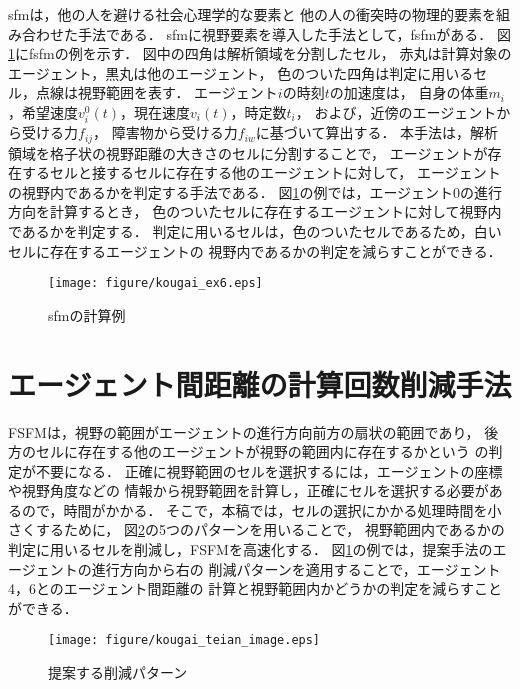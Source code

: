 \documentclass{maelab_y}
\begin{document}
sfmは，他の人を避ける社会心理学的な要素と
他の人の衝突時の物理的要素を組み合わせた手法である．
sfmに視野要素を導入した手法として，fsfmがある．
図\ref{fig:seru_ex1}にfsfmの例を示す．
図中の四角は解析領域を分割したセル，
赤丸は計算対象のエージェント，黒丸は他のエージェント，
色のついた四角は判定に用いるセル，点線は視野範囲を表す．
エージェント$i$の時刻$t$の加速度は，
自身の体重$m_i$，希望速度$v_i^0(t)$，現在速度$v_i(t)$，時定数$t_i$，
および，近傍のエージェントから受ける力$f_{ij}$，
障害物から受ける力$f_{iw}$に基づいて算出する．
本手法は，解析領域を格子状の視野距離の大きさのセルに分割することで，
エージェントが存在するセルと接するセルに存在する他のエージェントに対して，
エージェントの視野内であるかを判定する手法である．
図\ref{fig:seru_ex1}の例では，エージェント0の進行方向を計算するとき，
色のついたセルに存在するエージェントに対して視野内であるかを判定する．
判定に用いるセルは，色のついたセルであるため，白いセルに存在するエージェントの
視野内であるかの判定を減らすことができる．

\begin{figure}[hbtp]
 \begin{center}
  \texttt{[image: figure/kougai\_ex6.eps]}
  \caption{sfmの計算例}
  \label{fig:seru_ex1}
 \end{center}
\end{figure}
\fi

\section{エージェント間距離の計算回数削減手法}
FSFMは，視野の範囲がエージェントの進行方向前方の扇状の範囲であり，
後方のセルに存在する他のエージェントが視野の範囲内に存在するかという
の判定が不要になる．
正確に視野範囲のセルを選択するには，エージェントの座標や視野角度などの
情報から視野範囲を計算し，正確にセルを選択する必要があるので，時間がかかる．
そこで，本稿では，セルの選択にかかる処理時間を小さくするために，
図\ref{fig:teian_image}の5つのパターンを用いることで，
視野範囲内であるかの判定に用いるセルを削減し，FSFMを高速化する．
図\ref{fig:seru_ex1}の例では，提案手法のエージェントの進行方向から右の
削減パターンを適用することで，エージェント4，6とのエージェント間距離の
計算と視野範囲内かどうかの判定を減らすことができる．
　

\begin{figure}[hbtp]
 \begin{center}
  \texttt{[image: figure/kougai\_teian\_image.eps]}
  \caption{提案する削減パターン}
  \label{fig:teian_image}
 \end{center}
\end{figure}
\fi
\end{document}
